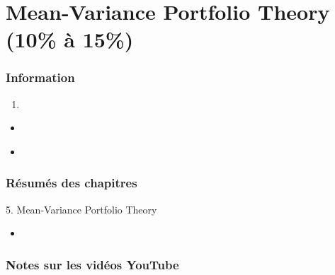 \chapter[Mean-Variance Portfolio Theory]{Mean-Variance Portfolio Theory (10\% à 15\%)}

\subsection{Information}

\begin{distributions}[Objective]

\end{distributions}

\begin{outcomes}
\begin{enumerate}
	\item	
\end{enumerate}
\end{outcomes}

\begin{ASM_chapter}
\begin{itemize}
	\item	{}
\end{itemize}
\end{ASM_chapter}

\begin{YTB_vids}
\begin{itemize}
	\item	
\end{itemize}
\end{YTB_vids}

\subsection{Résumés des chapitres}

\begin{CHPT_SUMM_AUTO}[label = {L.-5}]{5. Mean-Variance Portfolio Theory}
	\begin{itemize}
		\item	
	\end{itemize}
\end{CHPT_SUMM_AUTO}

\subsection{Notes sur les vidéos YouTube}

